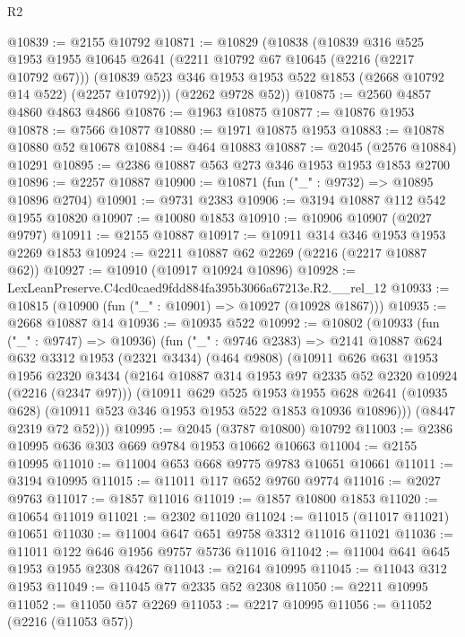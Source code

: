 \begin{lexlean}{R2}
\begin{coremodule}
@10839 := @2155 @10792
@10871 := @10829
    (@10838
      (@10839
        @316
        @525
        @1953
        @1955
        @10645
        @2641
        (@2211 @10792 @67 @10645 (@2216 (@2217 @10792 @67)))
        (@10839 @523 @346 @1953 @1953 @522 @1853 (@2668 @10792 @14 @522) (@2257 @10792)))
      (@2262 @9728 @52))
@10875 := @2560 @4857 @4860 @4863 @4866
@10876 := @1963 @10875
@10877 := @10876 @1953
@10878 := @7566 @10877
@10880 := @1971 @10875 @1953
@10883 := @10878 @10880 @52 @10678
@10884 := @464 @10883
@10887 := @2045 (@2576 @10884) @10291
@10895 := @2386 @10887 @563 @273 @346 @1953 @1953 @1853 @2700
@10896 := @2257 @10887
@10900 := @10871 (fun ("_" : @9732) => @10895 @10896 @2704)
@10901 := @9731 @2383
@10906 := @3194 @10887 @112 @542 @1955 @10820
@10907 := @10080 @1853
@10910 := @10906 @10907 (@2027 @9797)
@10911 := @2155 @10887
@10917 := @10911 @314 @346 @1953 @1953 @2269 @1853
@10924 := @2211 @10887 @62 @2269 (@2216 (@2217 @10887 @62))
@10927 := @10910 (@10917 @10924 @10896)
@10928 := LexLeanPreserve.C4cd0caed9fdd884fa395b3066a67213e.R2.__rel_12
@10933 := @10815 (@10900 (fun ("_" : @10901) => @10927 (@10928 @1867)))
@10935 := @2668 @10887 @14
@10936 := @10935 @522
@10992 := @10802
    (@10933
      (fun ("_" : @9747) => @10936)
      (fun ("_" : @9746 @2383) =>
      @2141
        @10887
        @624
        @632
        @3312
        @1953
        (@2321 @3434)
        (@464 @9808)
        (@10911
          @626
          @631
          @1953
          @1956
          @2320
          @3434
          (@2164 @10887 @314 @1953 @97 @2335 @52 @2320 @10924 (@2216 (@2347 @97)))
          (@10911
            @629
            @525
            @1953
            @1955
            @628
            @2641
            (@10935 @628)
            (@10911 @523 @346 @1953 @1953 @522 @1853 @10936 @10896)))
        (@8447 @2319 @72 @52)))
@10995 := @2045 (@3787 @10800) @10792
@11003 := @2386 @10995 @636 @303 @669 @9784 @1953 @10662 @10663
@11004 := @2155 @10995
@11010 := @11004 @653 @668 @9775 @9783 @10651 @10661
@11011 := @3194 @10995
@11015 := @11011 @117 @652 @9760 @9774
@11016 := @2027 @9763
@11017 := @1857 @11016
@11019 := @1857 @10800 @1853
@11020 := @10654 @11019
@11021 := @2302 @11020
@11024 := @11015 (@11017 @11021) @10651
@11030 := @11004 @647 @651 @9758 @3312 @11016 @11021
@11036 := @11011 @122 @646 @1956 @9757 @5736 @11016
@11042 := @11004 @641 @645 @1953 @1955 @2308 @4267
@11043 := @2164 @10995
@11045 := @11043 @312 @1953
@11049 := @11045 @77 @2335 @52 @2308
@11050 := @2211 @10995
@11052 := @11050 @57 @2269
@11053 := @2217 @10995
@11056 := @11052 (@2216 (@11053 @57))

\end{coremodule}
\end{lexlean}
